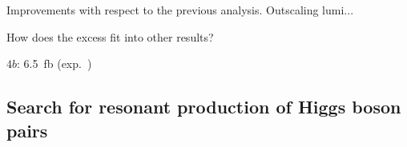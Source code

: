 Improvements with respect to the previous analysis. Outscaling lumi...

How does the excess fit into other results?

$4b$: \SI{6.5}{\femto\barn} (exp.\ )






\subsection{Search for resonant production of Higgs boson pairs}

